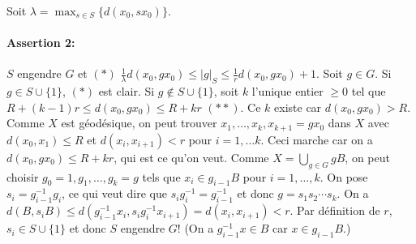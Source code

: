 \begin{preuve}
    Soit $\lambda = \max_{s \in S}\{d(x_0, sx_0)\}$.

    \paragraph{Assertion 2:} $S$ engendre $G$ et $(\ast)$ $\frac{1}{\lambda} d(x_0, gx_0) \leq |g|_S \leq
    \frac{1}{r}d(x_0, gx_0) + 1$. Soit $g \in G$. Si $g \in S \cup \{1\}$, $(\ast)$ est clair. Si $g \notin S
    \cup \{1\}$, soit $k$ l'unique entier $\geq 0$ tel que $R + (k-1)r \leq d(x_0, gx_0) \leq R + kr$
    $(\ast\ast)$. Ce $k$ existe car $d(x_0, gx_0) > R$. Comme $X$ est géodésique, on peut trouver $x_1,
    \ldots, x_k, x_{k+1} = gx_0$ dans $X$ avec $d(x_0, x_1) \leq R$ et $d(x_i, x_{i+1}) < r$ pour $i = 1,
    \ldots k$. Ceci marche car on a $d(x_0, gx_0) \leq R + kr$, qui est ce qu'on veut. Comme $X = \bigcup_{g
      \in G} gB$, on peut choisir $g_0 = 1, g_1, \ldots, g_k = g$ tels que $x_i \in g_{i-1}B$ pour $i = 1,
    \ldots, k$. On pose $s_i = g_{i-1}^{-1}g_i$, ce qui veut dire que $s_ig_i^{-1} = g_{i-1}^{-1}$ et donc $g = s_1s_2\cdots s_k$. On a $d(B, s_iB) \leq
    d(g_{i-1}^{-1}x_i, s_ig_i^{-1}x_{i+1}) = d(x_i, x_{i+1}) < r$. Par définition de $r$, $s_i \in S \cup
    \{1\}$ et donc $S$ engendre $G$! (On a $g_{i-1}^{-1} x \in B$ car $x \in g_{i-1}B$.) 
  \end{preuve}

  

  




